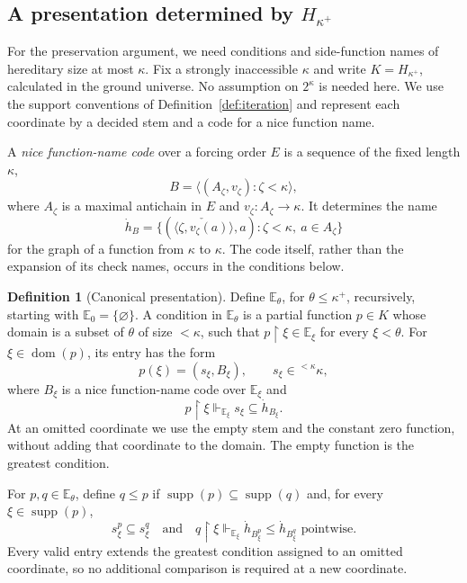 \documentclass[10pt,a4paper]{amsart}
\theoremstyle{definition}
\newtheorem{definition}[theorem]{Definition}
\theoremstyle{remark}
\newcommand{\EE}{\mathbb E}
\DeclareMathOperator{\dom}{dom}
\DeclareMathOperator{\supp}{supp}
\begin{document}
\subsection{A presentation determined by
  \texorpdfstring{\(H_{\kappa^+}\)}{H-kappa-plus}}
\label{subsec:canonical}

For the preservation argument, we need conditions and
side-function names of hereditary size at most \(\kappa\).
Fix a strongly inaccessible \(\kappa\) and write
\(K=H_{\kappa^+}\), calculated in the ground universe.
No assumption on \(2^\kappa\) is needed here.
We use the support conventions of Definition~\ref{def:iteration}
and represent each coordinate by a decided stem and a code
for a nice function name.

A \emph{nice function-name code} over a forcing order \(E\)
is a sequence of the fixed length \(\kappa\),
\[
 B=\langle(A_\zeta,v_\zeta):\zeta<\kappa\rangle,
\]
where \(A_\zeta\) is a maximal antichain in \(E\) and
\(v_\zeta:A_\zeta\to\kappa\). It determines the name
\[
 \dot h_B=
 \{(\check{\langle\zeta,v_\zeta(a)\rangle},a):
                   \zeta<\kappa,\ a\in A_\zeta\}
\]
for the graph of a function from \(\kappa\) to \(\kappa\).
The code itself, rather than the expansion of its check
names, occurs in the conditions below.

\begin{definition}[Canonical presentation]\label{def:canonical}
Define \(\EE_\theta\), for \(\theta\leq\kappa^+\),
recursively, starting with \(\EE_0=\{\varnothing\}\).
A condition in \(\EE_\theta\) is a partial function
\(p\in K\) whose domain is a subset of \(\theta\)
of size \(<\kappa\), such that
\(p\restriction\xi\in\EE_\xi\) for every \(\xi<\theta\).
For \(\xi\in\dom(p)\), its entry has the form
\[
 p(\xi)=(s_\xi,B_\xi),
 \qquad s_\xi\in{}^{<\kappa}\kappa,
\]
where \(B_\xi\) is a nice function-name code over
\(\EE_\xi\) and
\[
 p\restriction\xi\Vdash_{\EE_\xi}
                         s_\xi\subseteq\dot h_{B_\xi}.
\]
At an omitted coordinate we use the empty stem and the
constant zero function, without adding that coordinate to
the domain. The empty function is the greatest condition.

For \(p,q\in\EE_\theta\), define \(q\leq p\) if
\(\supp(p)\subseteq\supp(q)\) and, for every
\(\xi\in\supp(p)\),
\[
 s_\xi^p\subseteq s_\xi^q
 \quad\text{and}\quad
 q\restriction\xi\Vdash_{\EE_\xi}
             \dot h_{B_\xi^p}\leq\dot h_{B_\xi^q}
                         \text{ pointwise}.
\]
Every valid entry extends the greatest condition assigned to
an omitted coordinate, so no additional comparison is required
at a new coordinate.
\end{definition}
\end{document}
